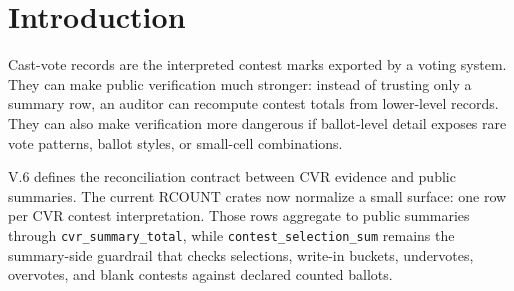 \section{Introduction}

Cast-vote records are the interpreted contest marks exported by a voting system.
They can make public verification much stronger: instead of trusting only a
summary row, an auditor can recompute contest totals from lower-level records.
They can also make verification more dangerous if ballot-level detail exposes
rare vote patterns, ballot styles, or small-cell combinations.

V.6 defines the reconciliation contract between CVR evidence and public
summaries. The current RCOUNT crates now normalize a small
 surface: one row per CVR contest interpretation.
Those rows aggregate to public summaries through \texttt{cvr\_summary\_total},
while \texttt{contest\_selection\_sum} remains the summary-side guardrail that
checks selections, write-in buckets, undervotes, overvotes, and blank contests
against declared counted ballots.
